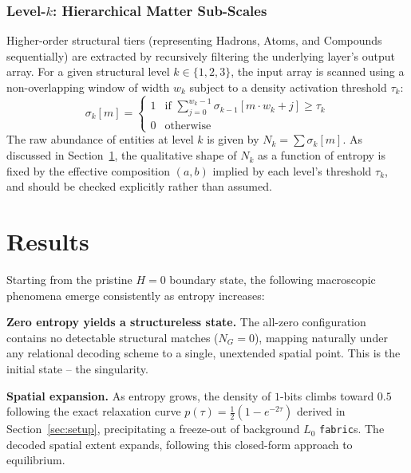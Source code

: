 \documentclass[11pt]{article}
\begin{document}
\subsubsection*{Level-$k$: Hierarchical Matter Sub-Scales}
Higher-order structural tiers (representing Hadrons, Atoms, and Compounds sequentially) are extracted by
recursively filtering the underlying layer's output array.
For a given structural level $k \in \{1, 2, 3\}$, the input array is scanned using a non-overlapping
window of width $w_k$ subject to a density activation threshold $\tau_k$:
\[
\sigma_k[m] = \begin{cases} 1 & \text{if } \sum_{j=0}^{w_k-1} \sigma_{k-1}[m \cdot w_k + j] \geq \tau_k \\ 0 & \text{otherwise} \end{cases}
\]
The raw abundance of entities at level $k$ is given by $N_k = \sum \sigma_k[m]$. As discussed in
Section~\ref{sec:results}, the qualitative shape of $N_k$ as a function of entropy is fixed by the effective
composition $(a,b)$ implied by each level's threshold $\tau_k$, and should be checked explicitly rather than
assumed.

\section{Results}
\label{sec:results}

Starting from the pristine $H=0$ boundary state, the following macroscopic phenomena emerge consistently as entropy increases:

\textbf{Zero entropy yields a structureless state.} The all-zero configuration contains no detectable structural matches ($N_G = 0$),
mapping naturally under any relational decoding scheme to a single, unextended spatial point. This is the initial state -- the singularity.

\textbf{Spatial expansion.} As entropy grows, the density of $1$-bits climbs toward $0.5$ following the exact relaxation curve
$p(\tau) = \tfrac12(1-e^{-2\tau})$ derived in Section~\ref{sec:setup}, precipitating a freeze-out of background $L_0$ \texttt{fabric}s.
The decoded spatial extent expands, following this closed-form approach to equilibrium.
\end{document}
